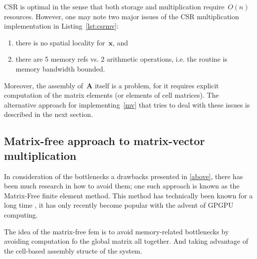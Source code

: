\documentclass[12pt]{article}
\newcommand{\vect}[1]{\boldsymbol{\mathbf{#1}}}
\begin{document}
CSR is optimal in the sense that both storage and multiplication require~$O(n)$ resources. However, one may note two major issues of the CSR multiplication implementation in Listing~\ref{lst:csrmv}:
\begin{enumerate}
	\item there is no spatial locality for~$\vect x$, and
	\item there are 5 memory refs vs. 2 arithmetic operations, i.e. the routine is memory bandwidth bounded.
\end{enumerate}
Moreover, the assembly of~$\vect A$ itself is a problem, for it requires explicit computation of the matrix elements (or elements of cell matrices). The alternative approach for implementing~\eqref{mv} that tries to deal with these issues is described in the next section.

\subsection{Matrix-free approach to matrix-vector multiplication}\label{sec:mfree}

In consideration of the bottlenecks a drawbacks presented in \ref{above}, there has been much research in how to avoid them; one such approach is known as the Matrix-Free finite element method. This method has technically been known for a long time \cite{first paper}, it has only recently become popular with the advent of GPGPU computing\cite{recent papers}. 

The idea of the matrix-free fem is to avoid memory-related bottlenecks by avoiding computation fo the global matrix all together. And taking advantage of the cell-based assembly structe of the system. 
\end{document}
